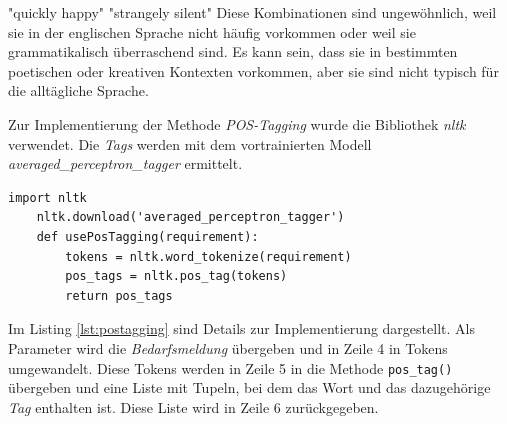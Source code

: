 "quickly happy"
"strangely silent"
Diese Kombinationen sind ungewöhnlich, weil sie in der englischen Sprache nicht häufig vorkommen oder weil sie grammatikalisch überraschend sind. Es kann sein, dass sie in bestimmten poetischen oder kreativen Kontexten vorkommen, aber sie sind nicht typisch für die alltägliche Sprache.\

Zur Implementierung der Methode \emph{POS-Tagging} wurde die Bibliothek \emph{nltk} verwendet. Die \emph{Tags} werden mit dem vortrainierten Modell \emph{averaged\_perceptron\_tagger} ermittelt.
\begin{lstlisting}[caption={Implementation des Moduls \emph{posTagging.py}}, label=lst:postagging]
	import nltk
	nltk.download('averaged_perceptron_tagger')
	def usePosTagging(requirement):
		tokens = nltk.word_tokenize(requirement)
		pos_tags = nltk.pos_tag(tokens)
		return pos_tags
\end{lstlisting}
Im Listing \ref{lst:postagging} sind Details zur Implementierung dargestellt. Als Parameter wird die \emph{Bedarfsmeldung} übergeben und in Zeile 4 in Tokens umgewandelt. Diese Tokens werden in Zeile 5 in die Methode \lstinline{pos_tag()}
übergeben und eine Liste mit Tupeln, bei dem das Wort und das dazugehörige \emph{Tag} enthalten ist. Diese Liste wird in Zeile 6 zurückgegeben.
